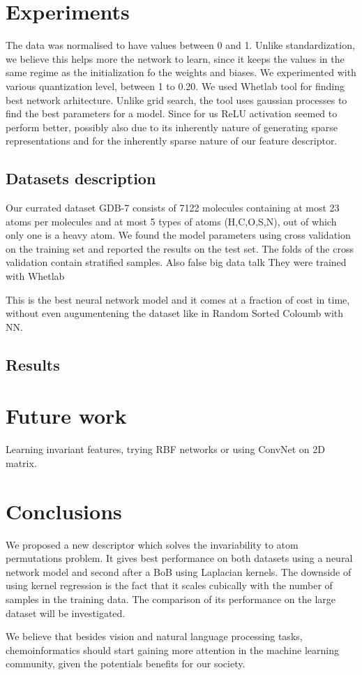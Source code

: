 \documentclass{article}
\begin{document}
\section{Experiments}
The data was normalised to have values between 0 and 1. Unlike standardization,
we believe this helps more the network to learn, since it keeps the values in the same regime as the initialization fo the weights and biases.
We experimented with various quantization level, between 1 to 0.20.
We used Whetlab tool for finding best network arhitecture. Unlike grid search, the tool uses gaussian processes to find the best parameters for a model.
Since for us ReLU activation seemed to perform better, possibly also due to its inherently nature of generating sparse representations and for the inherently sparse nature of our feature descriptor.

\subsection{Datasets description}
Our currated dataset GDB-7 consists of 7122 molecules containing at most 23 atoms per molecules and at most 5 types of atoms (H,C,O,S,N), out of which only one is a heavy atom. We found the model parameters using cross validation on the training set and reported the results on the test set. The folds of the cross validation contain stratified samples.
Also false big data talk \cite{falsebigdata}
They were trained with Whetlab \cite{whetlab}

This is the best neural network model and it comes at a fraction of cost in time, without even augumentening the dataset like in Random Sorted Coloumb with NN.

\subsection{Results}

\section{Future work}
Learning invariant features, trying RBF networks or using ConvNet on 2D matrix.

\section{Conclusions}
We proposed a new descriptor which solves the invariability to atom permutations problem. It gives best performance on both datasets using a neural network model and second after a BoB using Laplacian kernels. The downside of using kernel regression is the fact that it scales cubically with the number of samples in the training data. 
The comparison of its performance on the large dataset will be investigated.

We believe that besides vision and natural language processing tasks, chemoinformatics  should start gaining more attention  in the machine learning community, given the potentials benefits for our society.





\end{document}
